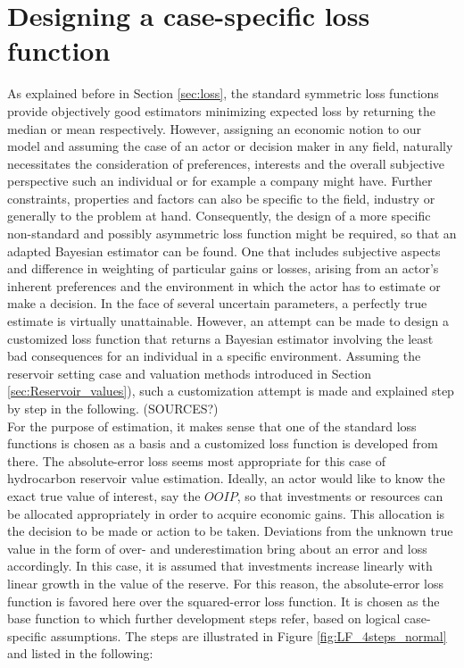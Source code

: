 		\section{Designing a case-specific loss function}\label{sec:LF_design}	
		As explained before in Section \ref{sec:loss}, the standard symmetric loss functions provide objectively good estimators minimizing expected loss by returning the median or mean respectively. However, assigning an economic notion to our model and assuming the case of an actor or decision maker in any field, naturally necessitates the consideration of preferences, interests and the overall subjective perspective such an individual or for example a company might have. Further constraints, properties and factors can also be specific to the field, industry or generally to the problem at hand. Consequently, the design of a more specific non-standard and possibly asymmetric loss function might be required, so that an adapted Bayesian estimator can be found. One that includes subjective aspects and difference in weighting of particular gains or losses, arising from an actor's inherent preferences and the environment in which the actor has to estimate or make a decision. In the face of several uncertain parameters, a perfectly true estimate is virtually unattainable. However, an attempt can be made to design a customized loss function that returns a Bayesian estimator involving the least bad consequences for an individual in a specific environment. Assuming the reservoir setting case and valuation methods introduced in Section \ref{sec:Reservoir_values}), such a customization attempt is made and explained step by step in the following. (SOURCES?)\\
		For the purpose of estimation, it makes sense that one of the standard loss functions is chosen as a basis and a customized loss function is developed from there. The absolute-error loss seems most appropriate for this case of hydrocarbon reservoir value estimation. Ideally, an actor would like to know the exact true value of interest, say the $OOIP$, so that investments or resources can be allocated appropriately in order to acquire economic gains. This allocation is the decision to be made or action to be taken. Deviations from the unknown true value in the form of over- and underestimation bring about an error and loss accordingly. In this case, it is assumed that investments increase linearly with linear growth in the value of the reserve. For this reason, the absolute-error loss function is favored here over the squared-error loss function. It is chosen as the base function to which further development steps refer, based on logical case-specific assumptions. The steps are illustrated in Figure \ref{fig:LF_4steps_normal} and listed in the following:
